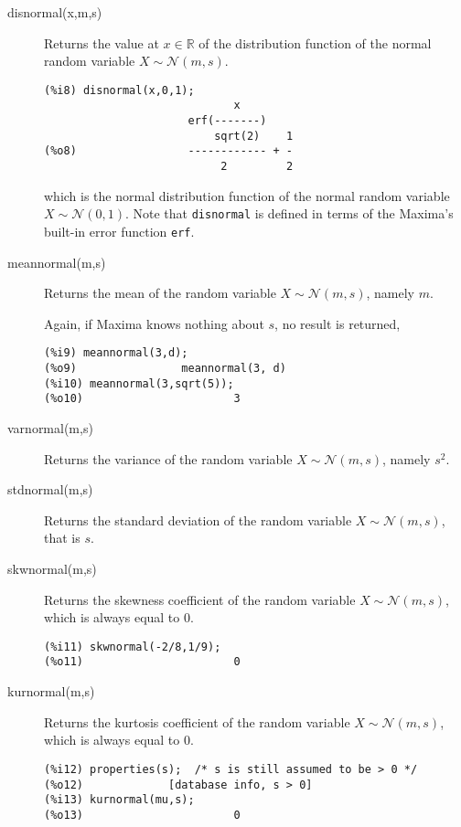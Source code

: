 \documentclass[12pt,a4paper]{article}
\newcommand{\normal}{\mathcal{N}}
\newcommand{\R}{\mathbb{R}}
\begin{document}
\begin{description}
\item[disnormal(x,m,s)] Returns the value at $x \in \R$ of the distribution function of the normal random variable $X \sim \normal(m,s)$.

\begin{verbatim}
(%i8) disnormal(x,0,1);
                             x
                      erf(-------)
                          sqrt(2)    1
(%o8)                 ------------ + -
                           2         2
\end{verbatim}
which is the normal distribution function of the normal random variable $X \sim \normal(0,1)$. Note that \verb|disnormal| is defined in terms of the Maxima's built-in error function \verb|erf|.

\item[meannormal(m,s)] Returns the mean of the random variable $X \sim \normal(m,s)$, namely $m$.

Again, if Maxima knows nothing about $s$, no result is returned,
\begin{verbatim}
(%i9) meannormal(3,d);
(%o9)                meannormal(3, d)
(%i10) meannormal(3,sqrt(5));
(%o10)                       3
\end{verbatim}

\item[varnormal(m,s)] Returns the variance of the random variable $X \sim \normal(m,s)$, namely $s^2$.

\item[stdnormal(m,s)] Returns the standard deviation of the random variable $X \sim \normal(m,s)$, that is $s$.

\item[skwnormal(m,s)] Returns the skewness coefficient of the random variable $X \sim \normal(m,s)$, which is always equal to $0$.

\begin{verbatim}
(%i11) skwnormal(-2/8,1/9);
(%o11)                       0
\end{verbatim}

\item[kurnormal(m,s)] Returns the kurtosis coefficient of the random variable $X \sim \normal(m,s)$, which is always equal to $0$.

\begin{verbatim}
(%i12) properties(s);  /* s is still assumed to be > 0 */
(%o12)             [database info, s > 0]
(%i13) kurnormal(mu,s);
(%o13)                       0
\end{verbatim}

\end{description}
\end{document}
